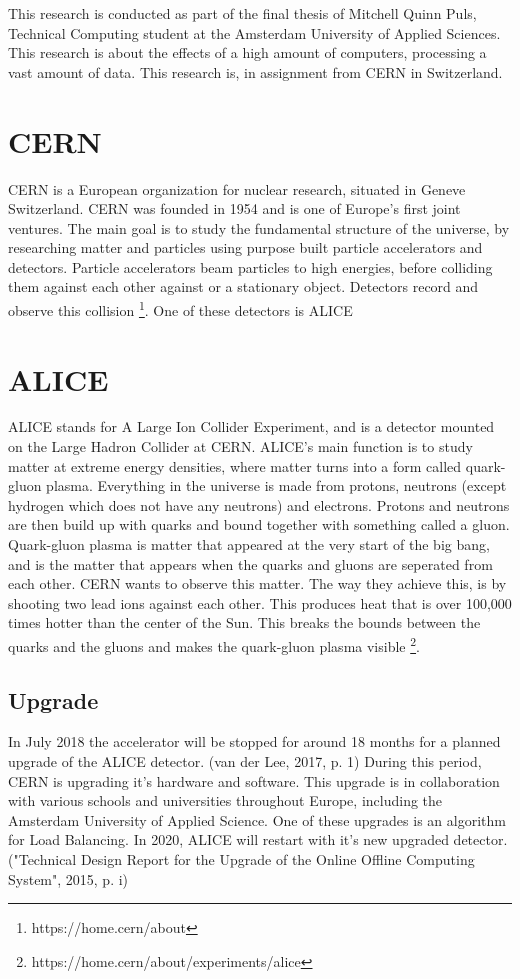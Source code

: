 This research is conducted as part of the final thesis of Mitchell Quinn Puls, Technical Computing student at the Amsterdam University of Applied Sciences. This research is about the effects of a high amount of computers, processing a vast amount of data. This research is, in assignment from CERN in Switzerland. 
\section{CERN}
CERN is a European organization for  nuclear research, situated in Geneve Switzerland. CERN was founded in 1954 and is one of Europe's first joint ventures. The main goal is to study the fundamental structure of the universe, by researching matter and particles using purpose built particle accelerators and detectors. Particle accelerators beam particles to high energies, before colliding them against each other against or a stationary object. Detectors record and observe this collision \footnote{https://home.cern/about}. One of these detectors is ALICE
\section{ALICE}
ALICE stands for A Large Ion Collider Experiment, and is a detector mounted on the Large Hadron Collider at CERN.  ALICE's main function is to study matter at extreme energy densities, where matter turns into a form called quark-gluon plasma. Everything in the universe is made from protons, neutrons (except hydrogen which does not have any neutrons) and electrons. Protons and neutrons are then build up with quarks and bound together with something called a gluon. Quark-gluon plasma is matter that appeared at the very start of the big bang, and is the matter that appears when the quarks and gluons are seperated from each other. CERN wants to observe this matter. The way they achieve this, is by shooting two lead ions against each other. This produces heat that is over 100,000 times hotter than the center of the Sun. This breaks the bounds between the quarks and the gluons and makes the quark-gluon plasma visible \footnote{https://home.cern/about/experiments/alice}.
\subsection{Upgrade}
In July 2018 the accelerator will be stopped for around 18 months for a planned upgrade of the ALICE detector. (van der Lee, 2017, p. 1) During this period, CERN is upgrading it's hardware and software. This upgrade is in collaboration with various schools and universities throughout Europe, including the Amsterdam University of Applied Science. One of these upgrades is an algorithm for Load Balancing. In 2020, ALICE will restart with it's new upgraded detector. ("Technical Design Report for the Upgrade of the Online Offline Computing System", 2015, p. i)

